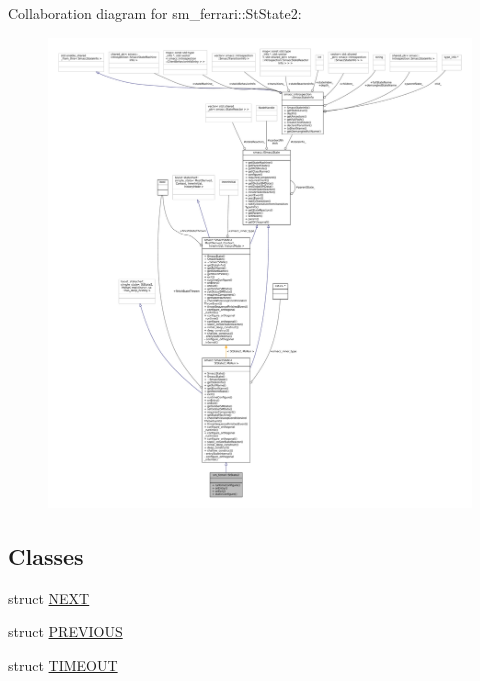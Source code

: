 Collaboration diagram for sm\+\_\+ferrari\+:\+:St\+State2\+:
\nopagebreak
\begin{figure}[H]
\begin{center}
\leavevmode
\includegraphics[width=350pt]{structsm__ferrari_1_1StState2__coll__graph}
\end{center}
\end{figure}
\subsection*{Classes}
\begin{DoxyCompactItemize}
\item 
struct \hyperlink{structsm__ferrari_1_1StState2_1_1NEXT}{N\+E\+XT}
\item 
struct \hyperlink{structsm__ferrari_1_1StState2_1_1PREVIOUS}{P\+R\+E\+V\+I\+O\+US}
\item 
struct \hyperlink{structsm__ferrari_1_1StState2_1_1TIMEOUT}{T\+I\+M\+E\+O\+UT}
\end{DoxyCompactItemize}
